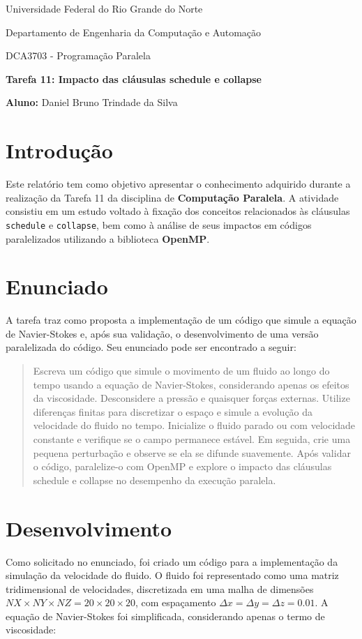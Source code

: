 \documentclass[a4paper, 12pt]{article}
\begin{document}
	\begin{center}
		Universidade Federal do Rio Grande do Norte
		
		Departamento de Engenharia da Computação e Automação  
		
		DCA3703 - Programação Paralela  
		
		\textbf{Tarefa 11: Impacto das cláusulas schedule e collapse}  
		
		\textbf{Aluno:} Daniel Bruno Trindade da Silva  
	\end{center}  
	
	\section{Introdução}  
	\hspace{.62cm}Este relatório tem como objetivo apresentar o conhecimento adquirido durante a realização da Tarefa 11 da disciplina de \textbf{Computação Paralela}. A atividade consistiu em um estudo voltado à fixação dos conceitos relacionados às cláusulas \texttt{schedule} e \texttt{collapse}, bem como à análise de seus impactos em códigos paralelizados utilizando a biblioteca \textbf{OpenMP}.  
	
	\section{Enunciado}  
	\hspace{.62cm}A tarefa traz como proposta a implementação de um código que simule a equação de Navier-Stokes e, após sua validação, o desenvolvimento de uma versão paralelizada do código. Seu enunciado pode ser encontrado a seguir:  
	
	\begin{quote}  
		Escreva um código que simule o movimento de um fluido ao longo do tempo usando a equação de Navier-Stokes, considerando apenas os efeitos da viscosidade. Desconsidere a pressão e quaisquer forças externas. Utilize diferenças finitas para discretizar o espaço e simule a evolução da velocidade do fluido no tempo. Inicialize o fluido parado ou com velocidade constante e verifique se o campo permanece estável. Em seguida, crie uma pequena perturbação e observe se ela se difunde suavemente. Após validar o código, paralelize-o com OpenMP e explore o impacto das cláusulas schedule e collapse no desempenho da execução paralela.  
	\end{quote}  
	
	\section{Desenvolvimento}  
	\hspace{.62cm}Como solicitado no enunciado, foi criado um código para a implementação da simulação da velocidade do fluido. O fluido foi representado como uma matriz tridimensional de velocidades, discretizada em uma malha de dimensões \( NX \times NY \times NZ = 20 \times 20 \times 20 \), com espaçamento \( \Delta x = \Delta y = \Delta z = 0.01 \). A equação de Navier-Stokes foi simplificada, considerando apenas o termo de viscosidade:  
	
\end{document}
